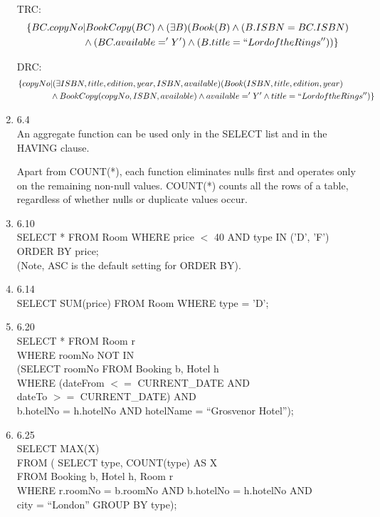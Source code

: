 \documentclass[10pt]{article}
\begin{document}
\begin{enumerate}
  TRC:
  \begin{align*}
    \{BC.copyNo &| BookCopy(BC) \land (\exists B)(Book(B) \land (B.ISBN
    = BC.ISBN)\\ &\land (BC.available='Y') \land (B.title=``Lord of the Rings''))\}
  \end{align*}

  DRC:
  \begin{align*}
    \{copyNo &| (\exists ISBN, title, edition, year, ISBN, available)
    (Book(ISBN, title, edition, year)\\ &\land BookCopy(copyNo, ISBN,
    available) \land available='Y' \land title=``Lord of the Rings'')\}
  \end{align*}

\item 6.4\\
  An aggregate function can be used only in the SELECT list and in the
  HAVING clause.

  Apart from COUNT(*), each function eliminates nulls first and
  operates only on the remaining non-null values. COUNT(*) counts all
  the rows of a table, regardless of whether nulls or duplicate values
  occur.

\item 6.10\\
  SELECT * FROM Room WHERE price $<$ 40 AND type IN ('D', 'F')
  ORDER BY price;\\

  (Note, ASC is the default setting for ORDER BY).

\item 6.14\\
  SELECT SUM(price) FROM Room WHERE type = 'D';

\item 6.20\\
  SELECT * FROM Room r\\
  WHERE roomNo NOT IN\\
  (SELECT roomNo FROM Booking b, Hotel h\\
  WHERE (dateFrom $<=$ CURRENT\_DATE AND\\
  dateTo $>=$ CURRENT\_DATE) AND\\
  b.hotelNo = h.hotelNo AND hotelName = ``Grosvenor Hotel'');

\item 6.25\\
  SELECT MAX(X)\\
  FROM ( SELECT type, COUNT(type) AS X\\
  FROM Booking b, Hotel h, Room r\\
  WHERE r.roomNo = b.roomNo AND b.hotelNo = h.hotelNo AND\\
  city = ``London'' GROUP BY type);


\end{enumerate}
\end{document}
